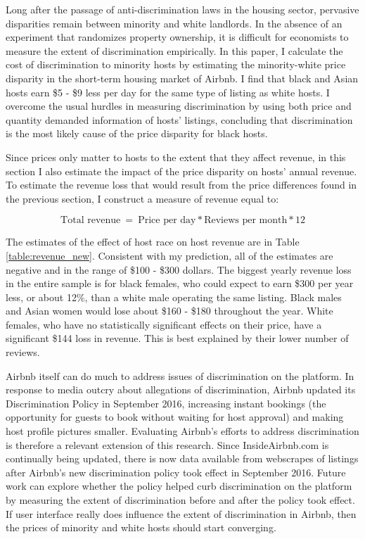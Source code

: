
Long after the passage of anti-discrimination laws in the housing sector, pervasive disparities remain between minority and white landlords. In the absence of an experiment that randomizes property ownership, it is difficult for economists to measure the extent of discrimination empirically. In this paper, I calculate the cost of discrimination to minority hosts by estimating the minority-white price disparity in the short-term housing market of Airbnb. I find that black and Asian hosts earn \$5 - \$9 less per day for the same type of listing as white hosts. I overcome the usual hurdles in measuring discrimination by using both price and quantity demanded information of hosts' listings, concluding that discrimination is the most likely cause of the price disparity for black hosts. 

Since prices only matter to hosts to the extent that they affect revenue, in this section I also estimate the impact of the price disparity on hosts' annual revenue. To estimate the revenue loss that would result from the price differences found in the previous section, I construct a measure of revenue equal to: 

\[\text{Total revenue} \ = \ \text{Price per day} * \text{Reviews per month}  * 12\] 

The estimates of the effect of host race on host revenue are in Table \ref{table:revenue_new}. Consistent with my prediction, all of the estimates are negative and in the range of \$100 - \$300 dollars. The biggest yearly revenue loss in the entire sample is for black females, who could expect to earn \$300 per year less, or about 12\%, than a white male operating the same listing. Black males and Asian women would lose about \$160 - \$180 throughout the year. White females, who have no statistically significant effects on their price, have a significant \$144 loss in revenue. This is best explained by their lower number of reviews. 

Airbnb itself can do much to address issues of discrimination on the platform. In response to media outcry about allegations of discrimination, Airbnb updated its Discrimination Policy in September 2016, increasing instant bookings (the opportunity for guests to book without waiting for host approval) and making host profile pictures smaller. Evaluating Airbnb's efforts to address discrimination is therefore a relevant extension of this research. Since InsideAirbnb.com is continually being updated, there is now data available from webscrapes of listings after Airbnb's new discrimination policy took effect in September 2016. Future work can explore whether the policy helped curb discrimination on the platform by measuring the extent of discrimination before and after the policy took effect. If user interface really does influence the extent of discrimination in Airbnb, then the prices of minority and white hosts should start converging. 

